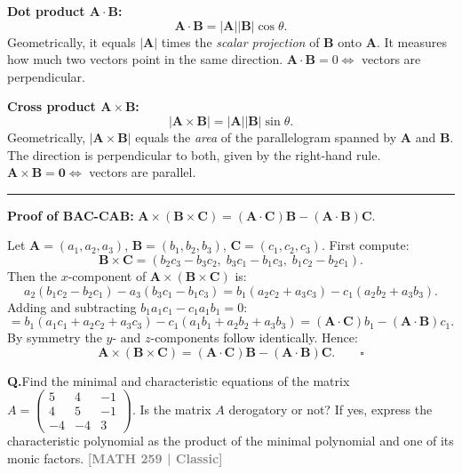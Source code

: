 \documentclass[12pt,a3paper]{article}
\newcommand{\yr}[1]{\hfill\textcolor{gray}{\small\textbf{[#1]}}}
\newcounter{qnum}
\newcommand{\Q}[1]{%
  \needspace{4\baselineskip}
  \refstepcounter{qnum}
  \vspace{6pt}
  \noindent\textbf{Q\theqnum.}\enspace #1\par
}
\begin{document}
\begin{tcolorbox}[enhanced,breakable,
  colback=cA!4,colframe=cA,boxrule=0.8pt,arc=5pt,
  title={\textbf{Answer --- Geometry of Dot/Cross Product; BAC-CAB Rule}},
  fonttitle=\bfseries\color{white},colbacktitle=cA]
 
\textbf{Dot product $\mathbf{A}\cdot\mathbf{B}$:}
\[
  \mathbf{A}\cdot\mathbf{B} = |\mathbf{A}||\mathbf{B}|\cos\theta.
\]
Geometrically, it equals $|\mathbf{A}|$ times the \emph{scalar projection} of $\mathbf{B}$ onto $\mathbf{A}$.
It measures how much two vectors point in the same direction.
$\mathbf{A}\cdot\mathbf{B}=0 \Leftrightarrow$ vectors are perpendicular.
 
\textbf{Cross product $\mathbf{A}\times\mathbf{B}$:}
\[
  |\mathbf{A}\times\mathbf{B}| = |\mathbf{A}||\mathbf{B}|\sin\theta.
\]
Geometrically, $|\mathbf{A}\times\mathbf{B}|$ equals the \emph{area} of the parallelogram spanned by $\mathbf{A}$ and $\mathbf{B}$.
The direction is perpendicular to both, given by the right-hand rule.
$\mathbf{A}\times\mathbf{B}=\mathbf{0} \Leftrightarrow$ vectors are parallel.
 
\medskip
\textcolor{cA}{\rule{\textwidth}{0.4pt}}
 
\textbf{Proof of BAC-CAB:} $\mathbf{A}\times(\mathbf{B}\times\mathbf{C}) = (\mathbf{A}\cdot\mathbf{C})\mathbf{B} - (\mathbf{A}\cdot\mathbf{B})\mathbf{C}$.
 
Let $\mathbf{A}=(a_1,a_2,a_3)$, $\mathbf{B}=(b_1,b_2,b_3)$, $\mathbf{C}=(c_1,c_2,c_3)$. First compute:
\[
\mathbf{B}\times\mathbf{C} = (b_2c_3-b_3c_2,\;b_3c_1-b_1c_3,\;b_1c_2-b_2c_1).
\]
Then the $x$-component of $\mathbf{A}\times(\mathbf{B}\times\mathbf{C})$ is:
\[
a_2(b_1c_2-b_2c_1) - a_3(b_3c_1-b_1c_3)
= b_1(a_2c_2+a_3c_3) - c_1(a_2b_2+a_3b_3).
\]
Adding and subtracting $b_1 a_1 c_1 - c_1 a_1 b_1 = 0$:
\[
= b_1(a_1c_1+a_2c_2+a_3c_3) - c_1(a_1b_1+a_2b_2+a_3b_3)
= (\mathbf{A}\cdot\mathbf{C})b_1 - (\mathbf{A}\cdot\mathbf{B})c_1.
\]
By symmetry the $y$- and $z$-components follow identically. Hence:
\[
  \mathbf{A}\times(\mathbf{B}\times\mathbf{C}) = (\mathbf{A}\cdot\mathbf{C})\mathbf{B} - (\mathbf{A}\cdot\mathbf{B})\mathbf{C}. \qquad\square
\]
 
\end{tcolorbox}
 
 

\Q{Find the minimal and characteristic equations of the matrix $A = \begin{pmatrix} 5 & 4 & -1 \\ 4 & 5 & -1 \\ -4 & -4 & 3 \end{pmatrix}$. Is the matrix $A$ derogatory or not? If yes, express the characteristic polynomial as the product of the minimal polynomial and one of its monic factors.
\yr{MATH 259 | Classic}}
\end{document}
